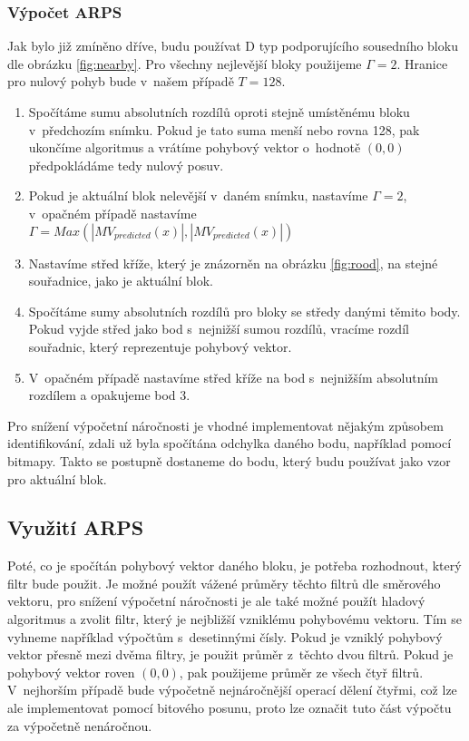 \documentclass[thesis=M,czech]{FITthesis}[2016/06/26]
\begin{document}
\subsubsection{Výpočet ARPS}
Jak bylo již zmíněno dříve, budu používat D typ podporujícího sousedního bloku dle obrázku \ref{fig:nearby}. Pro všechny nejlevější bloky použijeme $\Gamma=2$. Hranice pro nulový pohyb bude v~našem případě $T=128$.
\begin{enumerate}
\item Spočítáme sumu absolutních rozdílů oproti stejně umístěnému bloku v~předchozím snímku. Pokud je tato suma menší nebo rovna 128, pak ukončíme algoritmus a vrátíme pohybový vektor o~hodnotě $(0,0)$ předpokládáme tedy nulový posuv.
\item Pokud je aktuální blok nelevější v~daném snímku, nastavíme $\Gamma=2$, v~opačném případě nastavíme $\Gamma= \mathit{Max}(\left|MV_{predicted}(x)\right|,\left|MV_{predicted}(x)\right|)$
\item Nastavíme střed kříže, který je znázorněn na obrázku \ref{fig:rood}, na stejné souřadnice, jako je aktuální blok.
\item Spočítáme sumy absolutních rozdílů pro bloky se středy danými těmito body. Pokud vyjde střed jako bod s~nejnižší sumou rozdílů, vracíme rozdíl souřadnic, který reprezentuje pohybový vektor.
\item V~opačném případě nastavíme střed kříže na bod s~nejnižším absolutním rozdílem a opakujeme bod 3.
\end{enumerate}
Pro snížení výpočetní náročnosti je vhodné implementovat nějakým způsobem identifikování, zdali už byla spočítána odchylka daného bodu, například pomocí bitmapy. 
Takto se postupně dostaneme do bodu, který budu používat jako vzor pro aktuální blok. 

\subsection {Využití ARPS}
Poté, co je spočítán pohybový vektor daného bloku, je potřeba rozhodnout, který filtr bude použit. Je možné použít vážené průměry těchto filtrů dle směrového vektoru, pro snížení výpočetní náročnosti je ale také možné použít hladový algoritmus a zvolit filtr, který je nejbližší vzniklému pohybovému vektoru. Tím se vyhneme například výpočtům s~desetinnými čísly. Pokud je vzniklý pohybový vektor přesně mezi dvěma filtry, je použit průměr z~těchto dvou filtrů. Pokud je pohybový vektor roven $(0,0)$, pak použijeme průměr ze všech čtyř filtrů. V~nejhorším případě bude výpočetně nejnáročnější operací dělení čtyřmi, což lze ale implementovat pomocí bitového posunu, proto lze označit tuto část výpočtu za výpočetně nenáročnou.
\end{document}
